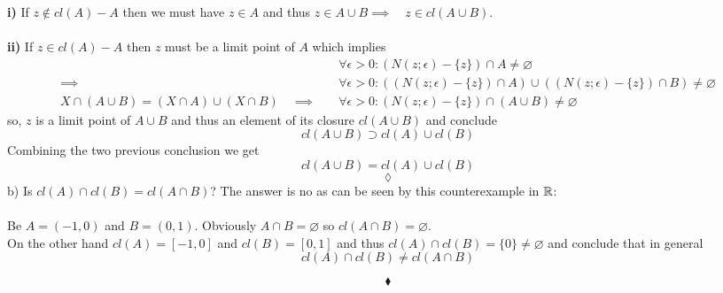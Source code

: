 \textbf{i)} If $z\not \in cl(A)-A$ then we must have $z \in A$ and thus $z\in A\cup B\implies\quad z\in cl(A\cup B)$.\\\\
\textbf{ii)} If $z\in cl(A)-A$ then $z$ must be a limit point of $A$ which implies 
\begin{align*}
&\forall\epsilon>0: \left(N(z;\epsilon)-\{z\}\right)\cap A\neq\varnothing\\
\implies\quad &\forall\epsilon>0: \left(\left(N(z;\epsilon)-\{z\}\right)\cap A\right)\cup\left(\left(N(z;\epsilon)-\{z\}\right)\cap B\right)\neq\varnothing\\
\scriptscriptstyle X\cap\left(A\cup B\right) = \left(X\cap A\right)\cup \left(X\cap B\right)\quad \displaystyle\implies\quad &\forall\epsilon>0:\left(N(z;\epsilon)-\{z\}\right)\cap \left(A\cup B\right)\neq\varnothing
\end{align*}
so, $z$ is a limit point of $A\cup B$ and thus an element of its closure $cl(A\cup B)$ and conclude 
$$cl(A \cup B)\supset cl(A)\cup cl(B)$$
Combining the two previous conclusion we get 
$$cl(A \cup B)= cl(A)\cup cl(B)$$
$$\lozenge$$
b) Is $cl(A)\cap cl(B)=cl(A \cap B)$?
The answer is no as can be seen by this counterexample in $\mathbb{R}$:\\\\
Be $A= (-1,0)$ and $B=(0,1)$. Obviously $A\cap B= \varnothing$ so $cl\left( A\cap B\right) =\varnothing$.\\
On the other hand $cl(A)= [-1,0]$ and $cl(B)=[0,1]$ and thus $cl(A)\cap cl({B})=\{0\}\neq\varnothing$
and conclude that in general 
$$cl(A)\cap cl(B)\neq cl(A \cap B)$$

$$\blacklozenge$$

\renewcommand{\thesubsection}{\thesection.\RomanNumeralCaps{7}}
\subsection{}

